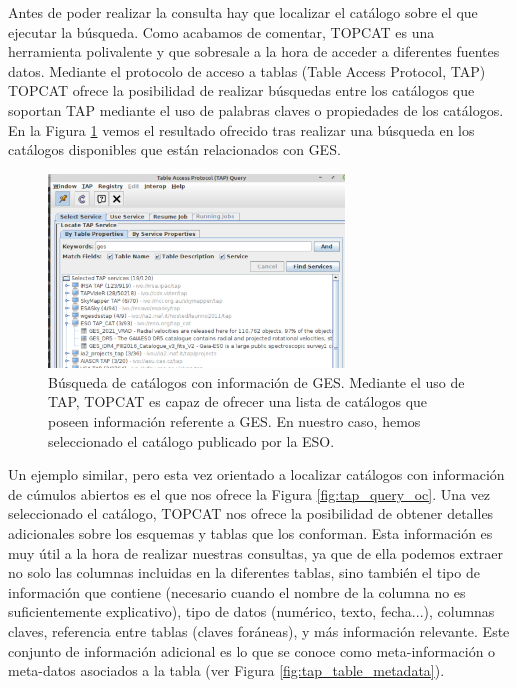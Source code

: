 Antes de poder realizar la consulta hay que localizar el catálogo sobre el que ejecutar la búsqueda. Como acabamos de comentar, TOPCAT es una herramienta polivalente y que sobresale a la hora de acceder a diferentes fuentes datos. Mediante el protocolo de acceso a tablas (Table Access Protocol, TAP) TOPCAT ofrece la posibilidad de realizar búsquedas entre los catálogos que soportan TAP mediante el uso de palabras claves o propiedades de los catálogos. En la Figura \ref{fig:tap_ges_service} vemos el resultado ofrecido tras realizar una búsqueda en los catálogos disponibles que están relacionados con GES.\par

\begin{figure}
	\centering
	\includegraphics[width=0.7\textwidth]{img/tesis/tap_ges_service.pdf}
	\caption{Búsqueda de catálogos con información de GES. Mediante el uso de TAP, TOPCAT es capaz de ofrecer una lista de catálogos que poseen información referente a GES. En nuestro caso, hemos seleccionado el catálogo publicado por la ESO.}
	\label{fig:tap_ges_service}
\end{figure}


Un ejemplo similar, pero esta vez orientado a localizar catálogos con información de cúmulos abiertos es el que nos ofrece la Figura \ref{fig:tap_query_oc}. Una vez seleccionado el catálogo, TOPCAT nos ofrece la posibilidad de obtener detalles adicionales sobre los esquemas y tablas que los conforman. Esta información es muy útil a la hora de realizar nuestras consultas, ya que de ella podemos extraer no solo las columnas incluidas en la diferentes tablas, sino también el tipo de información que contiene (necesario cuando el nombre de la columna no es suficientemente explicativo), tipo de datos (numérico, texto, fecha...), columnas claves, referencia entre tablas (claves foráneas), y más información relevante. Este conjunto de información adicional es lo que se conoce como meta-información o meta-datos asociados a la tabla (ver Figura \ref{fig:tap_table_metadata}).\par


